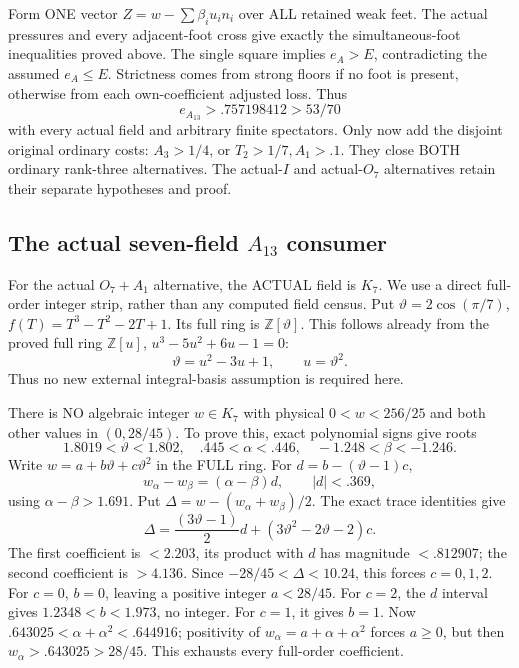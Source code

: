 \documentclass[11pt]{article}
\begin{document}
Form ONE vector \(Z=w-\sum\beta_i u_i n_i\)
over ALL retained weak feet.
The actual pressures and every adjacent-foot
cross give exactly the simultaneous-foot
inequalities proved above.
The single square implies \(e_A>E\),
contradicting the assumed \(e_A\le E\).
Strictness comes from strong floors if no
foot is present, otherwise from each
own-coefficient adjusted loss.
Thus
\[
                             e_{A_{13}}>.757198412>53/70
\tag{A13U}\label{eq:arithA13universal}
\]
with every actual field and arbitrary finite
spectators.
Only now add the disjoint original ordinary
costs: \(A_3>1/4\), or \(T_2>1/7,A_1>.1\).
They close BOTH ordinary rank-three alternatives.
The actual-\(I\) and actual-\(O_7\) alternatives
retain their separate hypotheses and proof.

\subsection[The actual seven-field A13 consumer]{The actual seven-field \(A_{13}\) consumer}
\label{app:arithA13seven}

For the actual \(O_7+A_1\) alternative,
the ACTUAL field is \(K_7\).
We use a direct full-order integer strip,
rather than any computed field census.
Put \(\vartheta=2\cos(\pi/7)\),
\(f(T)=T^3-T^2-2T+1\).
Its full ring is \(\mathbb Z[\vartheta]\).
This follows already from the proved full ring
\(\mathbb Z[u]\), \(u^3-5u^2+6u-1=0\):
\[
                    \vartheta=u^2-3u+1,\qquad u=\vartheta^2 .
\]
Thus no new external integral-basis assumption
is required here.

There is NO algebraic integer \(w\in K_7\)
with physical \(0<w<256/25\) and both other
values in \((0,28/45)\).
To prove this, exact polynomial signs give roots
\[
 1.8019<\vartheta<1.802,\quad .445<\alpha<.446,\quad
                         -1.248<\beta<-1.246 .
\]
Write \(w=a+b\vartheta+c\vartheta^2\) in
the FULL ring.
For \(d=b-(\vartheta-1)c\),
\[
             w_\alpha-w_\beta=(\alpha-\beta)d,\qquad |d|<.369 ,
\]
using \(\alpha-\beta>1.691\).
Put \(\Delta=w-(w_\alpha+w_\beta)/2\).
The exact trace identities give
\[
 \Delta={\frac{(3\vartheta-1)}{2}}d+
                     (3\vartheta^2-2\vartheta-2)c.
\]
The first coefficient is \(<2.203\), its product
with \(d\) has magnitude \(<.812907\);
the second coefficient is \(>4.136\).
Since \(-28/45<\Delta<10.24\), this forces
\(c=0,1,2\).
For \(c=0\), \(b=0\), leaving a positive integer
\(a<28/45\).
For \(c=2\), the \(d\) interval gives
\(1.2348<b<1.973\), no integer.
For \(c=1\), it gives \(b=1\).
Now
\(.643025<\alpha+\alpha^2<.644916\);
positivity of \(w_\alpha=a+\alpha+\alpha^2\)
forces \(a\ge0\), but then
\(w_\alpha>.643025>28/45\).
This exhausts every full-order coefficient.
\end{document}
